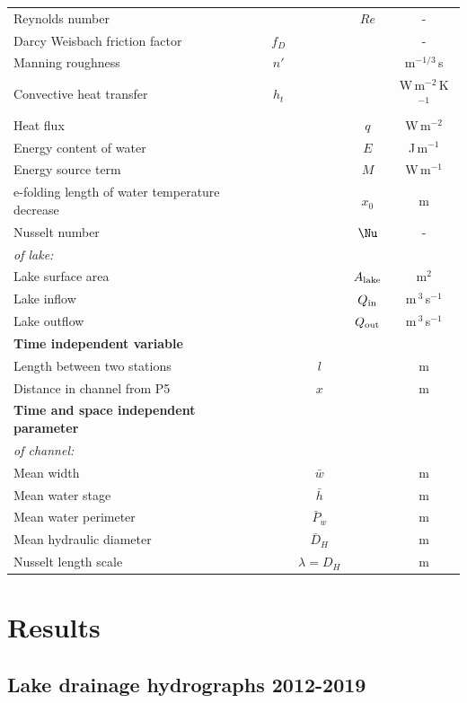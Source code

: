 \begin{table}[H]
\begin{tabular}{l c c c c }
Reynolds number &  && $Re$ & -\\
Darcy Weisbach friction factor & $f_D$ && & -\\
Manning roughness & $n'$ && & m$^{-1/3}$\,s\\
Convective heat transfer & $h_t$ && & W\,m$^{-2}$\,K$^{-1}$\\
Heat flux & && $q$ & W\,m$^{-2}$\\
Energy content of water &&& $E$ & J\,m$^{-1}$\\
Energy source term &&& $M$ & W\,m$^{-1}$\\
e-folding length of water temperature decrease  & && $x_0$ & m\\
Nusselt number & && $\Nu$ & - \\
\cline{1-1}
\textit{of lake:} & & & \\
Lake surface area & && $A_{\rm lake}$ & m$^2$\\
Lake inflow & & &$Q_{\rm in}$ & m\,$^3$\,s$^{-1}$\\
Lake outflow &  & &$Q_{\rm out}$  & m\,$^3$\,s$^{-1}$\\
\hline
\textbf{Time independent variable} & & &   \\
\hline
Length between two stations & & $l$ &  & m\\
Distance in channel from P5 & & $x$ &  & m\\
\hline
\textbf{Time and space independent parameter} & & & \\
\hline
\textit{of channel:} \\
Mean width & & $\bar w$ & &  m\\
Mean water stage & &$\bar h$&  & m\\
Mean water perimeter & &$\bar P_w$&  & m\\
Mean hydraulic diameter & &$\bar D_H$&  & m\\
Nusselt length scale  & &$\lambda = D_H$& & m\\
\hline
\end{tabular}
\label{table variable}
\end{table}

\FloatBarrier

\section{Results}
\label{sec:results}

\subsection{Lake drainage hydrographs 2012-2019}
\label{sec:results:phases}

